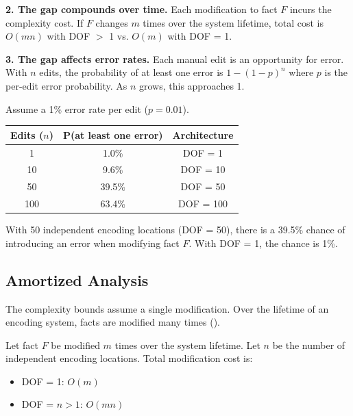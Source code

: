 \textbf{2. The gap compounds over time.} Each modification to fact $F$ incurs the complexity cost. If $F$ changes $m$ times over the system lifetime, total cost is $O(mn)$ with DOF $>$ 1 vs. $O(m)$ with DOF = 1.

\textbf{3. The gap affects error rates.} Each manual edit is an opportunity for error. With $n$ edits, the probability of at least one error is $1 - (1-p)^n$ where $p$ is the per-edit error probability. As $n$ grows, this approaches 1.

\begin{example}\label{ex:error-rate}
Assume a 1\% error rate per edit ($p = 0.01$).

\begin{center}
\begin{tabular}{ccc}
\toprule
\textbf{Edits ($n$)} & \textbf{P(at least one error)} & \textbf{Architecture} \\
\midrule
1 & 1.0\% & DOF = 1 \\
10 & 9.6\% & DOF = 10 \\
50 & 39.5\% & DOF = 50 \\
100 & 63.4\% & DOF = 100 \\
\bottomrule
\end{tabular}
\end{center}

With 50 independent encoding locations (DOF = 50), there is a 39.5\% chance of introducing an error when modifying fact $F$. With DOF = 1, the chance is 1\%.
\end{example}

\subsection{Amortized Analysis}\label{sec:amortized}

The complexity bounds assume a single modification. Over the lifetime of an encoding system, facts are modified many times ().

\begin{theorem}\label{thm:amortized}
Let fact $F$ be modified $m$ times over the system lifetime. Let $n$ be the number of independent encoding locations. Total modification cost is:
\begin{itemize}
\tightlist
\item DOF = 1: $O(m)$
\item DOF = $n > 1$: $O(mn)$
\end{itemize}
\end{theorem}

